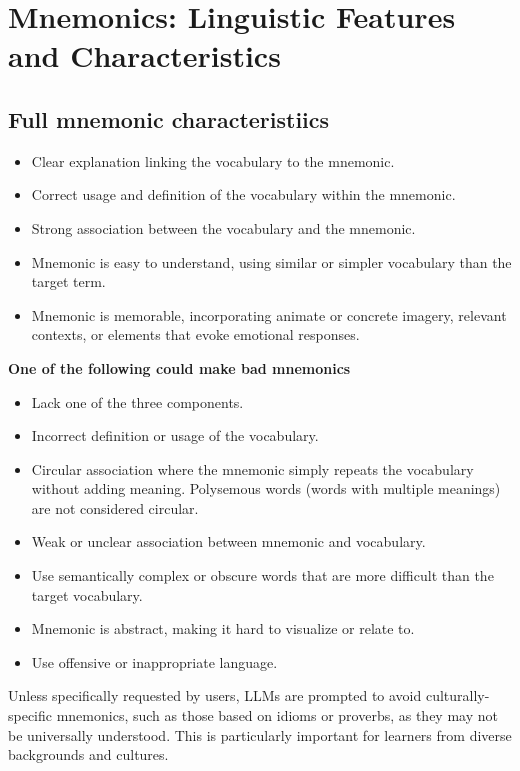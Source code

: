 \section{Mnemonics: Linguistic Features and Characteristics} \label{app:mnemonics}


\subsection{Full mnemonic characteristiics} \label{app:mnemonic-characteristics}

\begin{itemize}
  \item Clear explanation linking the vocabulary to the mnemonic.
  \item Correct usage and definition of the vocabulary within the mnemonic.
  \item Strong association between the vocabulary and the mnemonic.
  \item Mnemonic is easy to understand, using similar or simpler vocabulary than the target term.
  \item Mnemonic is memorable, incorporating animate or concrete imagery, relevant contexts, or elements that evoke emotional responses.
\end{itemize}

\textbf{One of the following could make bad mnemonics}
\begin{itemize}
  \item Lack one of the three components.
  \item Incorrect definition or usage of the vocabulary.
  \item Circular association where the mnemonic simply repeats the vocabulary without adding meaning. Polysemous words (words with multiple meanings) are not considered circular.
  \item Weak or unclear association between mnemonic and vocabulary.
  \item Use semantically complex or obscure words that are more difficult than the target vocabulary.
  \item Mnemonic is abstract, making it hard to visualize or relate to.
  \item Use offensive or inappropriate language.
\end{itemize}

Unless specifically requested by users, LLMs are prompted to avoid culturally-specific mnemonics, such as those based on idioms or proverbs, as they may not be universally understood. This is particularly important for learners from diverse backgrounds and cultures.
